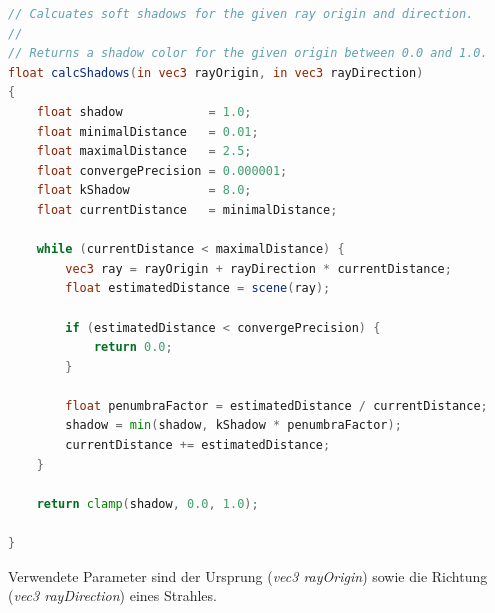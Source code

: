 \begin{lstlisting}[language=GLSL,caption={Funktion zur Berechnung von
        weichen Schatten  in
        GLSL.},label={alg:glsl_soft_shadows},captionpos=b,emph={calcShadows}]
// Calcuates soft shadows for the given ray origin and direction.
//
// Returns a shadow color for the given origin between 0.0 and 1.0.
float calcShadows(in vec3 rayOrigin, in vec3 rayDirection)
{
    float shadow            = 1.0;
    float minimalDistance   = 0.01;
    float maximalDistance   = 2.5;
    float convergePrecision = 0.000001;
    float kShadow           = 8.0;
    float currentDistance   = minimalDistance;

    while (currentDistance < maximalDistance) {
        vec3 ray = rayOrigin + rayDirection * currentDistance;
        float estimatedDistance = scene(ray);

        if (estimatedDistance < convergePrecision) {
            return 0.0;
        }

        float penumbraFactor = estimatedDistance / currentDistance;
        shadow = min(shadow, kShadow * penumbraFactor);
        currentDistance += estimatedDistance;
    }

    return clamp(shadow, 0.0, 1.0);

}
\end{lstlisting}

Verwendete Parameter sind der Ursprung (\textit{vec3 rayOrigin}) sowie
die Richtung (\textit{vec3 rayDirection}) eines Strahles.

